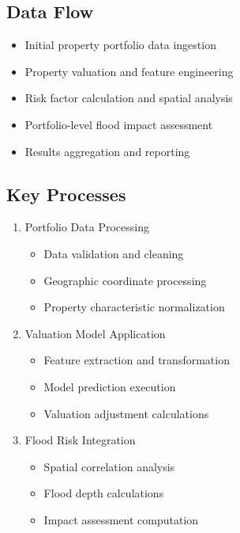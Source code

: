 \documentclass{article}
\begin{document}
\subsection{Data Flow}
\begin{itemize}
    \item Initial property portfolio data ingestion
    \item Property valuation and feature engineering
    \item Risk factor calculation and spatial analysis
    \item Portfolio-level flood impact assessment
    \item Results aggregation and reporting
\end{itemize}

\subsection{Key Processes}
\begin{enumerate}
    \item Portfolio Data Processing
        \begin{itemize}
            \item Data validation and cleaning
            \item Geographic coordinate processing
            \item Property characteristic normalization
        \end{itemize}
    
    \item Valuation Model Application
        \begin{itemize}
            \item Feature extraction and transformation
            \item Model prediction execution
            \item Valuation adjustment calculations
        \end{itemize}
    
    \item Flood Risk Integration
        \begin{itemize}
            \item Spatial correlation analysis
            \item Flood depth calculations
            \item Impact assessment computation
        \end{itemize}
\end{enumerate}
\end{document}
